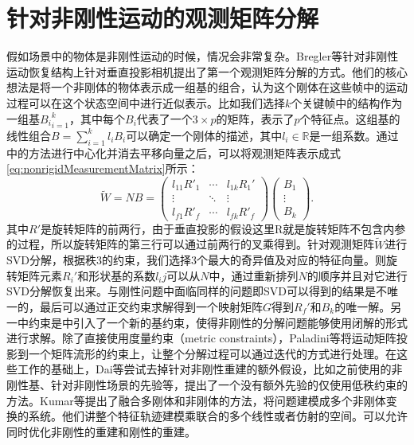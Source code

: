 \section{针对非刚性运动的观测矩阵分解}
假如场景中的物体是非刚性运动的时候，情况会非常复杂。Bregler\cite{Bregler2013Recovering}等针对非刚性运动恢复结构上针对垂直投影相机提出了第一个观测矩阵分解的方式。他们的核心想法是将一个非刚体的物体表示成一组基的组合，认为这个刚体在这些帧中的运动过程可以在这个状态空间中进行近似表示。比如我们选择$k$个关键帧中的结构作为一组基${B_i}_{i=1}^k$，其中每个$B_i$代表了一个$3\times p$的矩阵，表示了$p$个特征点。这组基的线性组合$B=\sum_{i=1}^k{l_i B_i}$可以确定一个刚体的描述，其中$l_i\in \mathbb{R}$是一组系数。通过\cite{Tomasi1992Shape}中的方法进行中心化并消去平移向量之后，可以将观测矩阵表示成式\eqref{eq:nonrigidMeasurementMatrix}所示：
\begin{equation}\label{eq:nonrigidMeasurementMatrix}
\tilde{W}=N B=
\begin{pmatrix}
l_{11}R'_1 &\cdots & l_{1k}R_1'\\
\vdots & \ddots & \vdots\\
l_{f1}R'_f & \cdots &l_{fk}R'_f
\end{pmatrix}
\begin{pmatrix}
B_1\\
\vdots\\
B_k
\end{pmatrix}.
\end{equation}
其中$R'$是旋转矩阵的前两行，由于垂直投影的假设这里R就是旋转矩阵不包含内参的过程，所以旋转矩阵的第三行可以通过前两行的叉乘得到。针对观测矩阵$\tilde{W}$进行SVD分解，根据秩3的约束，我们选择3个最大的奇异值及对应的特征向量。则旋转矩阵元素$R_i'$和形状基的系数$l_ij$可以从$N$中，通过重新排列$N$的顺序并且对它进行SVD分解恢复出来。与刚性问题中面临同样的问题即SVD可以得到的结果是不唯一的，最后可以通过正交约束求解得到一个映射矩阵$G$得到$R_f'$和$B_k$的唯一解。另一中约束是\cite{Xiao2006A}中引入了一个新的基约束，使得非刚性的分解问题能够使用闭解的形式进行求解。除了直接使用度量约束（metric constraints），Paladini等\cite{Paladini2009Factorization}将运动矩阵投影到一个矩阵流形的约束上，让整个分解过程可以通过迭代的方式进行处理。在这些工作的基础上，Dai等\cite{Dai2012A}尝试去掉针对非刚性重建的额外假设，比如之前使用的非刚性基、针对非刚性场景的先验等，提出了一个没有额外先验的仅使用低秩约束的方法。Kumar等\cite{Kumar2016Multi}提出了融合多刚体和非刚体的方法，将问题建模成多个非刚体变换的系统。他们讲整个特征轨迹建模乘联合的多个线性或者仿射的空间。可以允许同时优化非刚性的重建和刚性的重建。

